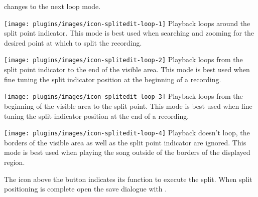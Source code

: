 \begin{description}
      changes to the next loop mode.
      \begin{description}
        \item
        \texttt{[image: plugins/images/icon-splitedit-loop-1]}
          Playback loops around the split point indicator. This mode is best
          used when searching and zooming for the desired point at which to split
          the recording.
        \item
        \texttt{[image: plugins/images/icon-splitedit-loop-2]}
          Playback loops from the split point indicator to the end of the
          visible area. This mode is best used when fine tuning the split
          indicator position at the beginning of a recording.
        \item
        \texttt{[image: plugins/images/icon-splitedit-loop-3]}
          Playback loops from the beginning of the
          visible area to the split point. This mode is best used when fine
          tuning the split indicator position at the end of a recording.
        \item
        \texttt{[image: plugins/images/icon-splitedit-loop-4]}
          Playback doesn't loop, the borders of the visible
          area as well as the split point indicator are ignored. This mode is
          best used when playing the song outside of the borders of the displayed
          region.
      \end{description}
    \item[Perform the split (8)]
          The icon above the
          button indicates its function to execute the split. When split
          positioning is complete open the save dialogue with
          .
  \end{description}

